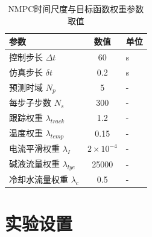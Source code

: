 \begin{table}[!htbp]
  \centering
  \caption{NMPC时间尺度与目标函数权重参数取值}
  \label{tab:params_nmpc}
  \small
  \begin{tabular}{@{}l c l@{}}
    \toprule
    \textbf{参数} & \textbf{数值} & \textbf{单位} \\
    \midrule
    控制步长 $\Delta t$ & 60 & s \\
    仿真步长 $\delta t$ & 0.2 & s \\
    预测时域 $N_p$ & 5 & - \\
    每步子步数 $N_s$ & 300 & - \\
    \addlinespace
    跟踪权重 $\lambda_{track}$ & 1.2 & - \\
    温度权重 $\lambda_{temp}$ & 0.15 & - \\
    电流平滑权重 $\lambda_I$ & $2 \times 10^{-4}$ & - \\
    碱液流量权重 $\lambda_{lye}$ & 25000 & - \\
    冷却水流量权重 $\lambda_c$ & 0.5 & - \\
    \bottomrule
  \end{tabular}
\end{table}


\chapter{实验设置}
\label{app:experiment_settings}


